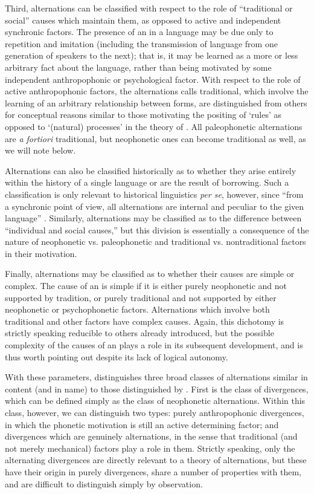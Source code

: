 Third, alternations can be classified with respect to the role of
``traditional or social'' causes which maintain them, as opposed to
active and independent synchronic factors. The presence of an
 in a language may be due only to repetition and imitation
(including the transmission of language from one generation of
speakers to the next); that is, it may be learned as a more or less
arbitrary fact about the language, rather than being motivated by some
independent anthropophonic or psychological factor. With respect to
the role of active anthropophonic factors, the alternations {\Baudouin}
calls traditional, which involve the learning of an arbitrary
relationship between forms, are distinguished from others for
conceptual reasons similar to those motivating the positing of `rules'
as opposed to `(natural) processes' in the theory of 
\citep{donegan.stampe79:study.of.np}. All paleophonetic alternations
are \emph{a fortiori} traditional, but neophonetic ones can become
traditional as well, as we will note below.

Alternations can also be classified historically as to whether they
arise entirely within the history of a single language or are the
result of borrowing. Such a classification is only relevant to
historical linguistics \emph{per se}, however, since ``from a
synchronic point of view, all alternations are internal and peculiar
to the given language'' \citep[162]{baudouin95:attempt}. Similarly,
alternations may be classified as to the difference between
``individual and social causes,'' but this division is essentially a
consequence of the nature of neophonetic vs. paleophonetic and
traditional vs. nontraditional factors in their motivation.

Finally, alternations may be classified as to whether their causes are
simple or complex. The cause of an  is simple if it is
either purely neophonetic and not supported by tradition, or purely
traditional and not supported by either neophonetic or psychophonetic
factors. Alternations which involve both traditional and other factors
have complex causes. Again, this dichotomy is strictly speaking
reducible to others already introduced, but the possible complexity of
the causes of an  plays a role in its subsequent
development, and is thus worth pointing out despite its lack of
logical autonomy.

With these parameters, {\Baudouin} distinguishes three broad classes of
alternations similar in content (and in name) to those distinguished
by {\Kruszewski}. First is the class of divergences, which can be defined
simply as the class of neophonetic alternations. Within this class,
however, we can distinguish two types: purely anthropophonic
divergences, in which the phonetic motivation is still an active
determining factor; and divergences which are genuinely alternations,
in the sense that traditional (and not merely mechanical) factors play
a role in them. Strictly speaking, only the alternating divergences
are directly relevant to a theory of alternations, but these have
their origin in purely  divergences, share a number of
 properties with them, and are difficult to distinguish
simply by observation.

